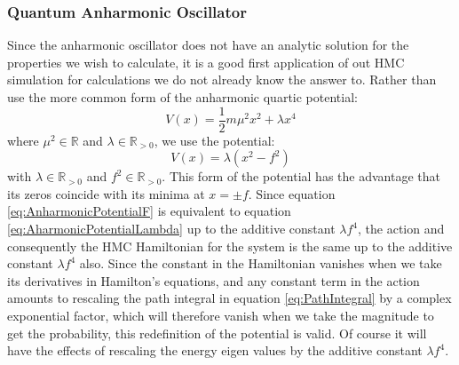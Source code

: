 \documentclass[12pt]{article}
\begin{document}
        \subsubsection{Quantum Anharmonic Oscillator}
            Since the anharmonic oscillator does not have an analytic solution for the properties we wish to calculate, it is a good first application of out HMC simulation for calculations we do not already know the answer to. Rather than use the more common form of the anharmonic quartic potential:
            \begin{equation}
                \label{eq:AharmonicPotentialLambda}
                V\left(x\right) = \frac{1}{2}m\mu^2x^2+\lambda x^4
            \end{equation}
            where $\mu^2 \in\mathbb{R}$ and $\lambda\in\mathbb{R}_{>0}$, we use the potential:
            \begin{equation}
                \label{eq:AnharmonicPotentialF}
                V\left(x\right) = \lambda\left(x^2-f^2\right)
            \end{equation}
            with $\lambda\in\mathbb{R}_{>0}$ and $f^2\in\mathbb{R}_{>0}$. This form of the potential has the advantage that its zeros coincide with its minima at $x=\pm f$. Since equation \ref{eq:AnharmonicPotentialF} is equivalent to equation \ref{eq:AharmonicPotentialLambda} up to the additive constant $\lambda f^4$, the action and consequently the HMC Hamiltonian for the system is the same up to the additive constant $\lambda f^4$ also. Since the constant in the Hamiltonian vanishes when we take its derivatives in Hamilton's equations, and any constant term in the action amounts to rescaling the path integral in equation \ref{eq:PathIntegral} by a complex exponential factor, which will therefore vanish when we take the magnitude to get the probability, this redefinition of the potential is valid. Of course it will have the effects of rescaling the energy eigen values by the additive constant $\lambda f^4$. 
\end{document}
